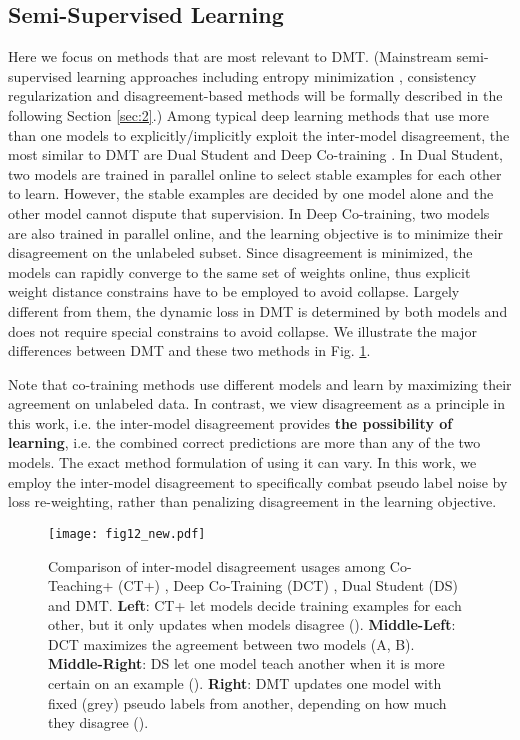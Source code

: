 \documentclass[preprint,review,10pt]{elsarticle}
\begin{document}
\subsection{Semi-Supervised Learning}
\label{sec:61}
 Here we focus on methods that are most relevant to DMT.  (Mainstream semi-supervised learning approaches including  entropy minimization \cite{lee2013pseudo,cascante2020curriculum,hung}, consistency regularization \cite{tarvainen2017mean,french2019semisupervised,ouali2020semi} and disagreement-based methods \cite{qiao2018deep,peng2020deep} will be formally described in the following Section \ref{sec:2}.) Among typical deep learning methods that use more than one models to explicitly/implicitly exploit the inter-model disagreement, the most similar to DMT are Dual Student \cite{ke2019dual} and Deep Co-training \cite{qiao2018deep}. In Dual Student, two models are trained in parallel online to select stable examples for each other to learn. However, the stable examples are decided by one model alone and the other model cannot dispute that supervision. In Deep Co-training, two models are also trained in parallel online, and the learning objective is to minimize their disagreement on the unlabeled subset. Since disagreement is minimized, the models can rapidly converge to the same set of weights online, thus explicit weight distance constrains have to be employed to avoid collapse. Largely different from them, the dynamic loss in DMT is determined by both models and does not require special constrains to avoid collapse. We illustrate the major differences between DMT and these two methods in Fig. \ref{fig7}.

Note that co-training methods \cite{qiao2018deep,peng2020deep} use different models and learn by maximizing their agreement on unlabeled data. In contrast, we view disagreement \cite{zhou2010semi} as a principle in this work, i.e. the inter-model disagreement provides \textbf{the possibility of learning}, i.e. the combined correct predictions are more than any of the two models. The exact method formulation of using it can vary. In this work, we employ the inter-model disagreement to specifically combat pseudo label noise by loss re-weighting, rather than penalizing disagreement in the learning objective.


\begin{figure}[t]
\centering
\texttt{[image: fig12\_new.pdf]}
\caption{Comparison of inter-model disagreement usages among Co-Teaching+ (CT+) \cite{yu2019does}, Deep Co-Training (DCT) \cite{qiao2018deep}, Dual Student (DS) \cite{ke2019dual} and DMT. \textbf{Left}: CT+ let models decide training examples for each other, but it only updates when models disagree (). \textbf{Middle-Left}: DCT maximizes the agreement between two models (A, B). \textbf{Middle-Right}: DS let one model teach another when it is more certain on an example (). \textbf{Right}: DMT updates one model with fixed (grey) pseudo labels from another, depending on how much they disagree (). }
\label{fig7}
\end{figure}
\end{document}

